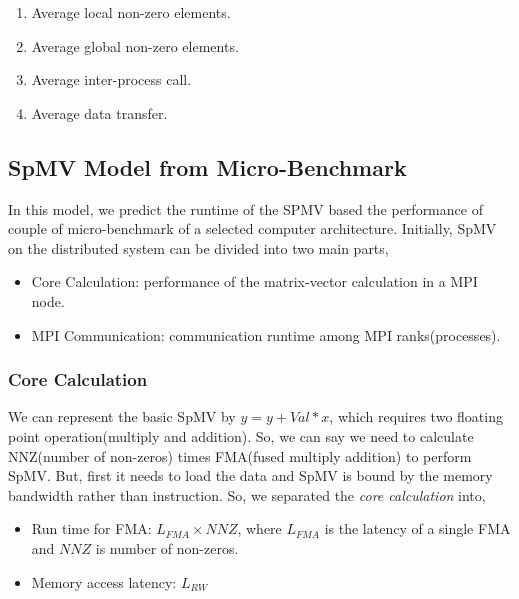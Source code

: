 \documentclass[conference, 10ppt]{IEEEtran}
\begin{document}
\begin{enumerate}
\item Average local non-zero elements.
\item Average global non-zero elements.
\item Average inter-process call.
\item Average data transfer.
\end{enumerate}

\subsection{SpMV Model from Micro-Benchmark}
In this model, we predict the runtime of the SPMV based the performance of couple of micro-benchmark of 
a selected computer architecture. Initially, SpMV on the distributed system can be divided into two main parts,
\begin{itemize}
\item Core Calculation: performance of the matrix-vector calculation in a MPI node.
\item MPI Communication: communication runtime among MPI ranks(processes). 
\end{itemize}
\subsubsection{Core Calculation}
We can represent the basic SpMV by $y=y+Val*x$, which requires two floating point operation(multiply and addition). 
So, we can say we need to calculate NNZ(number of non-zeros) times FMA(fused multiply addition) to perform SpMV.
But, first it needs to load the data and SpMV is bound by the memory bandwidth rather than instruction. So, we 
separated the \textit{core calculation} into,
\begin{itemize}
\item Run time for FMA: $L_{FMA}\times NNZ$, where $L_{FMA}$ is the latency of a single FMA and $NNZ$ is number of non-zeros.
\item Memory access latency: $L_{RW}$
\end{itemize} 
\end{document}
